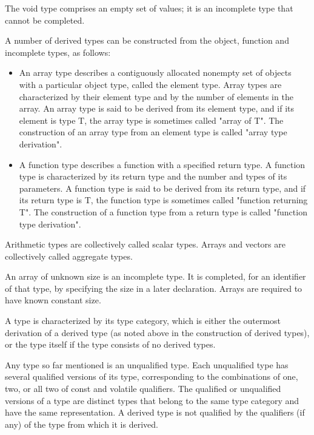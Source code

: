 \documentclass{article}
\begin{document}
The void type comprises an empty set of values; it is an incomplete type that cannot be
completed.
\linebreak

A number of derived types can be constructed from the object, function and incomplete 
types, as follows:
\linebreak

\begin{itemize}
	\item An array type describes a contiguously allocated nonempty set of objects with a 
	      particular object type, called the element type. Array types are characterized 
	      by their element type and by the number of elements in the array.  An array type
	      is said to be derived	from its element type, and if its element is type T, the 
	      array type is sometimes called "array of T".  The construction of an array type
		  from an element type is called "array type derivation".
	\item A function type describes a function with a specified return type. A function
		  type is characterized by its return type and the number and types of its
		  parameters. A function type is said to be derived from its return type, and if 
		  its return type is T, the function type is sometimes called "function returning
		   T". The construction of a function type from a return type is called "function
		   type derivation".
\end{itemize}

Arithmetic types are collectively called scalar types. Arrays and vectors are 
collectively called aggregate types.
\linebreak

An array of unknown size is an incomplete type.  It is completed, for an identifier of 
that type, by specifying the size in a later declaration.  Arrays are required to have 
known constant size.
\linebreak

A type is characterized by its type category, which is either the outermost derivation 
of a derived type (as noted above in the construction of derived types), or the type 
itself if the type consists of no derived types.
\linebreak

Any type so far mentioned is an unqualified type.  Each unqualified type has several 
qualified versions of its type, corresponding to the combinations of one, two, or all 
two of const and volatile qualifiers.  The qualified or unqualified versions of a type 
are distinct types that belong to the same type category and have the same representation.
A derived type is not qualified by the qualifiers (if any) of the type from which it 
is derived.
\linebreak
\end{document}
